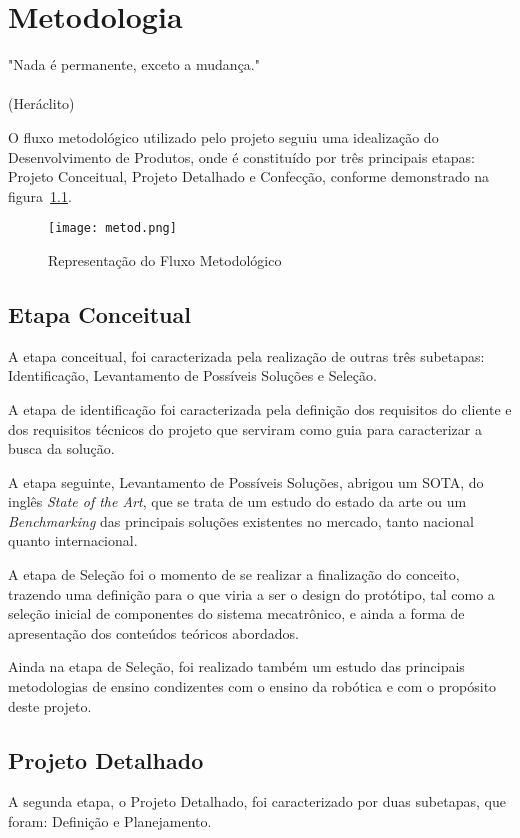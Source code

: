 \chapter{Metodologia}
\label{chap:meto}
\begin{flushright}
	"Nada é permanente, exceto a mudança." \\
	\ \\
	(Heráclito)
\end{flushright}

O fluxo metodológico utilizado pelo projeto seguiu uma idealização do Desenvolvimento de Produtos, onde é constituído por três principais etapas: Projeto Conceitual, Projeto Detalhado e Confecção, conforme demonstrado na figura~\ref{fig:metod}.  

\begin{figure}[h!]										\caption{Representação do Fluxo Metodológico}
	\label{fig:metod}		
	\centering										
	\texttt{[image: metod.png]}
\end{figure}

\section{Etapa Conceitual}
A etapa conceitual, foi caracterizada pela realização de outras três subetapas: Identificação, Levantamento de Possíveis Soluções e Seleção.

A etapa de identificação foi caracterizada pela definição dos requisitos do cliente e dos requisitos técnicos do projeto que serviram como guia para caracterizar a busca da solução.

A etapa seguinte, Levantamento de Possíveis Soluções, abrigou um SOTA, do inglês \textit{State of the Art}, que se trata de um estudo do estado da arte ou um \textit{Benchmarking} das principais soluções existentes no mercado, tanto nacional quanto internacional.

A etapa de Seleção foi o momento de se realizar a finalização do conceito, trazendo uma definição para o que viria a ser o design do protótipo, tal como a seleção inicial de componentes do sistema mecatrônico, e ainda a forma de apresentação dos conteúdos teóricos abordados.

Ainda na etapa de Seleção, foi realizado também um estudo das principais metodologias de ensino condizentes com o ensino da robótica e com o propósito deste projeto.

\section{Projeto Detalhado} 
A segunda etapa, o Projeto Detalhado, foi caracterizado por duas subetapas, que foram: Definição e Planejamento.

